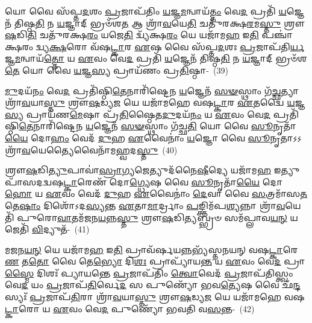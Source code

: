 {\anuvakamend[{𑌤𑍇\-\ul{𑌨𑍈}\-𑌵 𑌬𑍍𑌰𑌹𑍍𑌮᳴ \ul{𑌰𑌾}\-𑌷𑍍𑌟𑍍𑌰\-\ul{𑌮𑍇}\-𑌵𑌾𑌸𑍍𑌯᳴ \ul{𑌯}\-𑌜𑍍𑌞𑌸𑍍𑌯᳴ 𑌪𑍍𑌰𑌾𑌜𑌾\-\ul{𑌪}\-𑌤𑍍𑌯𑍞 𑌷𑌟𑍍𑌤𑍍𑌰𑌿𑍞᳴𑌶𑌚𑍍𑌚}]}%

𑌯𑍋 𑌵𑍈 𑌸᳴𑌪𑍍𑌤\-\ul{𑌦}\-𑌶𑌂 \ul{𑌪𑍍𑌰}\-𑌜𑌾𑌪᳴𑌤𑌿𑌂 \ul{𑌯}\-𑌜𑍍𑌞\-\ul{𑌮}\-𑌨𑍍𑌵𑌾𑌯᳴\-\ul{𑌤𑍍𑌤𑌂} 𑌵𑍇\-\ul{𑌦} 𑌪𑍍𑌰𑌤𑌿᳴ \ul{𑌯}\-𑌜𑍍𑌞𑍇𑌨᳴ 𑌤𑌿𑌷𑍍𑌠\-\ul{𑌤𑌿} 𑌨 \ul{𑌯}\-𑌜𑍍𑌞𑌾𑌦𑍍 𑌭𑍍𑌰𑍞᳴𑌶\-\ul{𑌤} 𑌆 𑌶𑍍𑌰𑌾᳴\-\ul{𑌵}\-𑌯𑍇\-\ul{𑌤𑌿} 𑌚𑌤𑍁᳴𑌰𑌕𑍍𑌷\-\ul{𑌰}\-𑌮\-\ul{𑌸𑍍𑌤𑍁} 𑌶𑍍𑌰𑍗\-\ul{𑌷}\-𑌡𑌿\-\ul{𑌤𑌿} 𑌚𑌤𑍁᳴𑌰𑌕𑍍𑌷\-\ul{𑌰𑌂} 𑌯𑌜𑍇\-\ul{𑌤𑌿} 𑌦𑍍𑌵𑍍𑌯᳴𑌕𑍍𑌷\-\ul{𑌰𑌂} 𑌯𑍇 𑌯𑌜𑌾᳴𑌮\-\ul{𑌹} 𑌇\-\ul{𑌤𑌿} 𑌪𑌞𑍍𑌚𑌾॑𑌕𑍍𑌷𑌰𑌂 𑌦𑍍𑌵𑍍𑌯\-\ul{𑌕𑍍𑌷}\-𑌰𑍋 𑌵᳴𑌷\-\ul{𑌟𑍍𑌕𑌾}\-𑌰 \ul{𑌏}\-𑌷 𑌵𑍈 𑌸᳴𑌪𑍍𑌤\-\ul{𑌦}\-𑌶𑌃 \ul{𑌪𑍍𑌰}\-𑌜𑌾𑌪᳴𑌤𑌿\-\ul{𑌰𑍍𑌯}\-𑌜𑍍𑌞\-\ul{𑌮}\-𑌨𑍍𑌵𑌾𑌯᳴\-\ul{𑌤𑍍𑌤𑍋} 𑌯 \ul{𑌏}\-𑌵𑌂 𑌵𑍇\-\ul{𑌦} 𑌪𑍍𑌰𑌤𑌿᳴ \ul{𑌯}\-𑌜𑍍𑌞𑍇𑌨᳴ 𑌤𑌿𑌷𑍍𑌠\-\ul{𑌤𑌿} 𑌨 \ul{𑌯}\-𑌜𑍍𑌞𑌾𑌦𑍍 𑌭𑍍𑌰𑍞᳴𑌶\-\ul{𑌤𑍇} 𑌯𑍋 𑌵𑍈 \ul{𑌯}\-𑌜𑍍𑌞\-\ul{𑌸𑍍𑌯} 𑌪𑍍𑌰𑌾𑌯᳴𑌣𑌂 𑌪𑍍𑌰\-\ul{𑌤𑌿}\-𑌷𑍍𑌠𑌾-~(39)

\-\ul{𑌮𑍁}\-𑌦𑌯᳴\-\ul{𑌨𑌂} 𑌵𑍇\-\ul{𑌦} 𑌪𑍍𑌰𑌤𑌿᳴𑌷𑍍𑌠𑌿\-\ul{𑌤𑍇}\-𑌨𑌾𑌰𑌿᳴𑌷𑍍𑌟𑍇𑌨 \ul{𑌯}\-𑌜𑍍𑌞𑍇𑌨᳴ \ul{𑌸}\-\-\ul{𑍟}\-𑌸𑍍𑌥𑌾𑌂 𑌗᳴\-\ul{𑌚𑍍𑌛}\-𑌤𑍍𑌯𑌾 𑌶𑍍𑌰𑌾᳴\-\ul{𑌵}\-𑌯𑌾\-\ul{𑌸𑍍𑌤𑍁} 𑌶𑍍𑌰𑍗\-\ul{𑌷}\-𑌡𑍍𑌯\-\ul{𑌜} 𑌯𑍇 𑌯𑌜𑌾᳴𑌮𑌹𑍇 𑌵𑌷\-\ul{𑌟𑍍𑌕𑌾}\-𑌰 \ul{𑌏}\-𑌤𑌦𑍍𑌵𑍈 \ul{𑌯}\-𑌜𑍍𑌞\-\ul{𑌸𑍍𑌯} 𑌪𑍍𑌰𑌾𑌯᳴𑌣\-\ul{𑌮𑍇}\-𑌷𑌾 𑌪𑍍𑌰᳴\-\ul{𑌤𑌿}\-𑌷𑍍𑌠𑍈𑌤\-\ul{𑌦𑍁}\-𑌦𑌯᳴\-\ul{𑌨𑌂} 𑌯 \ul{𑌏}\-𑌵𑌂 𑌵𑍇\-\ul{𑌦} 𑌪𑍍𑌰𑌤𑌿᳴𑌷𑍍𑌠𑌿\-\ul{𑌤𑍇}\-𑌨𑌾𑌰𑌿᳴𑌷𑍍𑌟𑍇𑌨 \ul{𑌯}\-𑌜𑍍𑌞𑍇𑌨᳴ \ul{𑌸}\-\-\ul{𑍟}\-𑌸𑍍𑌥𑌾𑌂 𑌗᳴𑌚𑍍𑌛\-\ul{𑌤𑌿} 𑌯𑍋 𑌵𑍈 \ul{𑌸𑍂}\-𑌨𑍃𑌤𑌾᳴\-\ul{𑌯𑍈} 𑌦𑍋\-\ul{𑌹𑌂} 𑌵𑍇𑌦᳴ \ul{𑌦𑍁}\-𑌹 \ul{𑌏}\-𑌵𑍈𑌨𑌾𑌂॑ \ul{𑌯}\-𑌜𑍍𑌞𑍋 𑌵𑍈 \ul{𑌸𑍂}\-𑌨𑍃𑌤𑌾\-𑌽\-𑌽𑌶𑍍𑌰𑌾᳴\-\ul{𑌵}\-𑌯𑍇𑌤𑍍𑌯𑍈𑌵𑍈𑌨𑌾᳴𑌮\-\ul{𑌹𑍍𑌵}\-𑌦\-\ul{𑌸𑍍𑌤𑍁}\-~(40)

𑌶𑍍𑌰𑍗\-\ul{𑌷}\-𑌡𑌿\-\ul{𑌤𑍍𑌯𑍁}\-𑌪𑌾𑌵𑌾॑\-\ul{𑌸𑍍𑌰𑌾}\-𑌗𑍍𑌯𑌜𑍇𑌤𑍍𑌯𑍁𑌦᳴𑌨𑍈\-\ul{𑌷𑍀}\-𑌦𑍍𑌯𑍇 𑌯𑌜𑌾᳴𑌮\-\ul{𑌹} 𑌇𑌤𑍍𑌯𑍁𑌪𑌾᳴𑌸\-𑌦𑌦𑍍𑌵𑌷\-\ul{𑌟𑍍𑌕𑌾}\-𑌰𑍇𑌣᳴ 𑌦𑍋\-\ul{𑌗𑍍𑌧𑍍𑌯𑍇}\-𑌷 𑌵𑍈 \ul{𑌸𑍂}\-𑌨𑍃𑌤𑌾᳴\-\ul{𑌯𑍈} 𑌦𑍋\-\ul{𑌹𑍋} 𑌯 \ul{𑌏}\-𑌵𑌂 𑌵𑍇𑌦᳴ \ul{𑌦𑍁}\-𑌹 \ul{𑌏}\-𑌵𑍈𑌨𑌾𑌂॑ \ul{𑌦𑍇}\-𑌵𑌾 𑌵𑍈 \ul{𑌸}\-𑌤𑍍𑌰𑌮𑌾᳴𑌸\-\ul{𑌤} 𑌤𑍇\-\ul{𑌷𑌾𑌂} 𑌦𑌿𑌶𑍋᳴\-𑌽𑌦\-\ul{𑌸𑍍𑌯}\-𑌨𑍍𑌤 \ul{𑌏}\-𑌤𑌾\-\ul{𑌮𑌾}\-𑌰𑍍𑌦𑍍𑌰𑌾𑌂 \ul{𑌪}\-𑌙𑍍𑌕𑍍𑌤𑌿𑌮᳴𑌪\-\ul{𑌶𑍍𑌯}\-𑌨𑍍𑌨𑌾 𑌶𑍍𑌰𑌾᳴\-\ul{𑌵}\-𑌯𑍇𑌤𑌿᳴ 𑌪𑍁𑌰𑍋\-\ul{𑌵𑌾}\-𑌤𑌮᳴𑌜𑌨\-\ul{𑌯}\-𑌨𑍍𑌨\-\ul{𑌸𑍍𑌤𑍁} 𑌶𑍍𑌰𑍗\-\ul{𑌷}\-𑌡𑌿\-\ul{𑌤𑍍𑌯}\-𑌬𑍍𑌭𑍍𑌰𑍞 𑌸𑌮᳴𑌪𑍍𑌲𑌾𑌵\-\ul{𑌯}\-\-\ul{𑌨𑍍} 𑌯𑌜𑍇𑌤𑌿᳴ \ul{𑌵𑌿}\-𑌦𑍍𑌯𑍁𑌤᳴-~(41)

𑌮𑌜𑌨\-\ul{𑌯}\-\-\ul{𑌨𑍍} 𑌯𑍇 𑌯𑌜𑌾᳴𑌮\-\ul{𑌹} 𑌇\-\ul{𑌤𑌿} 𑌪𑍍𑌰𑌾𑌵᳴𑌰𑍍\mbox{}𑌷𑌯\-\ul{𑌨𑍍𑌨}\-𑌭𑍍𑌯᳴𑌸𑍍𑌤𑌨𑌯𑌨𑍍 𑌵𑌷\-\ul{𑌟𑍍𑌕𑌾}\-𑌰𑍇\-\ul{𑌣} 𑌤\-\ul{𑌤𑍋} 𑌵𑍈 𑌤𑍇\-\ul{𑌭𑍍𑌯𑍋} 𑌦𑌿\-\ul{𑌶𑌃} 𑌪𑍍𑌰𑌾𑌪𑍍𑌯𑌾᳴𑌯\-\ul{𑌨𑍍𑌤} 𑌯 \ul{𑌏}\-𑌵𑌂 𑌵𑍇\-\ul{𑌦} 𑌪𑍍𑌰𑌾\-\ul{𑌸𑍍𑌮𑍈} 𑌦𑌿𑌶𑌃᳴ 𑌪𑍍𑌯𑌾𑌯𑌨𑍍𑌤𑍇 \ul{𑌪𑍍𑌰}\-𑌜𑌾𑌪᳴𑌤𑌿𑌂 \ul{𑌤𑍍𑌵𑍋}\-𑌵𑍇𑌦᳴ \ul{𑌪𑍍𑌰}\-𑌜𑌾𑌪᳴𑌤𑌿𑌸𑍍𑌤𑍍𑌵𑌂 𑌵𑍇\-\ul{𑌦} 𑌯𑌂 \ul{𑌪𑍍𑌰}\-𑌜𑌾𑌪᳴\-\ul{𑌤𑌿}\-𑌰𑍍𑌵𑍇\-\ul{𑌦} 𑌸 𑌪𑍁𑌣𑍍𑌯𑍋᳴ 𑌭𑌵\-\ul{𑌤𑍍𑌯𑍇}\-𑌷 𑌵𑍈 𑌛᳴\-\ul{𑌨𑍍𑌦}\-𑌸𑍍𑌯𑌃᳴ \ul{𑌪𑍍𑌰}\-𑌜𑌾𑌪᳴\-\ul{𑌤𑌿}\-𑌰𑌾 𑌶𑍍𑌰𑌾᳴\-\ul{𑌵}\-𑌯𑌾\-\ul{𑌸𑍍𑌤𑍁} 𑌶𑍍𑌰𑍗\-\ul{𑌷}\-𑌡𑍍𑌯\-\ul{𑌜} 𑌯𑍇 𑌯𑌜𑌾᳴𑌮𑌹𑍇 𑌵𑌷\-\ul{𑌟𑍍𑌕𑌾}\-𑌰𑍋 𑌯 \ul{𑌏}\-𑌵𑌂 𑌵𑍇\-\ul{𑌦} 𑌪𑍁𑌣𑍍𑌯𑍋᳴ 𑌭𑌵𑌤𑌿 𑌵\-\ul{𑌸}\-𑌨𑍍𑌤-~(42)

